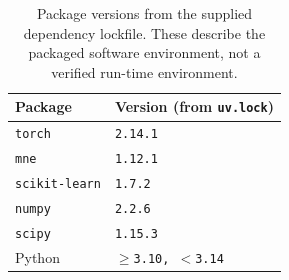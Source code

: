 \begin{table}[htbp]\centering\small
\begin{tabular}{ll}
\toprule
Package & Version (from \texttt{uv.lock}) \\
\midrule
\texttt{torch} & \texttt{2.14.1} \\
\texttt{mne} & \texttt{1.12.1} \\
\texttt{scikit-learn} & \texttt{1.7.2} \\
\texttt{numpy} & \texttt{2.2.6} \\
\texttt{scipy} & \texttt{1.15.3} \\
Python & \texttt{$\geq$3.10, $<$3.14} \\
\bottomrule\end{tabular}
\caption{Package versions from the supplied dependency lockfile. These describe the packaged software environment, not a verified run-time environment.}
\label{tab:s-environment}\end{table}

